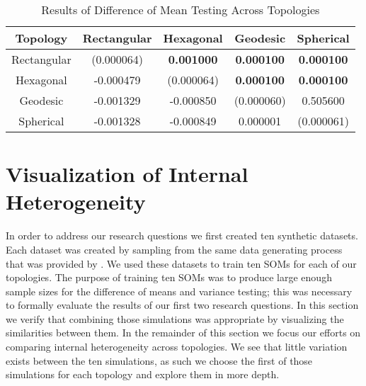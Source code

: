 \begin{table}[h]
  \begin{minipage}{\textwidth}
  \caption{Results of Difference of Mean Testing Across Topologies}
  \label{rlt:all}
  \begin{tabular}{|c||c|c|c|c|}
  \hline
  \textbf{Topology}&Rectangular	&Hexagonal &Geodesic &Spherical\\\hline
  \hline
   Rectangular & (0.000064) & \textbf{0.001000} & \textbf{0.000100} & \textbf{0.000100}\\\hline
   Hexagonal & -0.000479 & (0.000064) & \textbf{0.000100} & \textbf{0.000100}\\\hline
   Geodesic & -0.001329 & -0.000850 & (0.000060) & 0.505600\\\hline
   Spherical & -0.001328 & -0.000849 & 0.000001 & (0.000061)\\\hline

  \end{tabular}
  \end{minipage}
\end{table}

\section{Visualization of Internal Heterogeneity}
\label{rdq3}
In order to address our research questions we first created ten synthetic
datasets.  Each dataset was created by sampling from the same data generating process
that was provided by \cite{wu2006}.  We used these datasets to train ten
SOMs for each of our topologies.  The purpose of training ten SOMs was to
produce large enough sample sizes for the difference of means and variance
testing; this was necessary to formally evaluate the results of our first two
research questions.  In this section we verify that combining those
simulations was appropriate by visualizing the similarities between them.
In the remainder of this section we focus our efforts on comparing internal
heterogeneity across
topologies.  We see that little variation exists between the ten
simulations, as such we choose the first of those simulations for each topology and
explore them in more depth.

